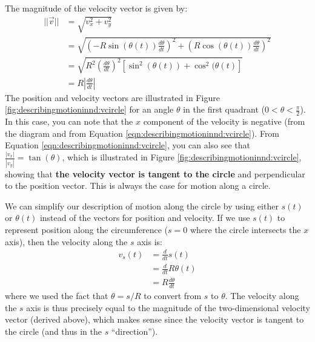 The magnitude of the velocity vector is given by:
\begin{align*}
||\vec v|| &=\sqrt{ v_x^2+v_y^2}\\
&=\sqrt{ \left(-R\sin(\theta(t))\frac{d\theta}{dt}\right)^2+\left(R\cos(\theta(t))\frac{d\theta}{dt}\right)^2}\\
&=\sqrt{ R^2\left( \frac{d\theta}{dt}\right)^2[\sin^2(\theta(t))+\cos^2(\theta(t)]}\\
&=R\left |\frac{d\theta}{dt}\right|
\end{align*}
The position and velocity vectors are illustrated in Figure \ref{fig:describingmotioninnd:vcircle} for an angle $\theta$ in the first quadrant ($0<\theta<\frac{\pi}{2}$).
In this case, you can note that the $x$ component of the velocity is negative (from the diagram and from Equation \ref{eqn:describingmotioninnd:vcircle}). From Equation \ref{eqn:describingmotioninnd:vcircle}, you can also see that $\frac{|v_x|}{|v_y|}=\tan(\theta)$, which is illustrated in Figure \ref{fig:describingmotioninnd:vcircle}, showing that \textbf{the velocity vector is tangent to the circle} and perpendicular to the position vector. This is always the case for motion along a circle.

We can simplify our description of motion along the circle by using either $s(t)$ or $\theta(t)$ instead of the vectors for position and velocity. If we use $s(t)$ to represent position along the circumference ($s=0$ where the circle intersects the $x$ axis), then the velocity along the $s$ axis is:
\begin{align*}
v_s(t)&=\frac{d}{dt}s(t)\\
&=\frac{d}{dt}R\theta(t)\\
&=R\frac{d\theta}{dt}
\end{align*}
where we used the fact that $\theta=s/R$ to convert from $s$ to $\theta$. The velocity along the $s$ axis is thus precisely equal to the magnitude of the two-dimensional velocity vector (derived above), which makes sense since the velocity vector is tangent to the circle (and thus in the $s$ ``direction'').

